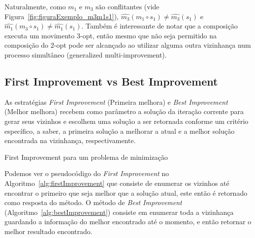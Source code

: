 Naturalmente, como $m_1$ e $m_3$ são conflitantes (vide Figura~\ref{fig:figuraExemplo_m3m1s1}), $\widehat{m_3}(m_1 \circ s_1) \neq \widehat{m_3}(s_1)$ e $\widehat{m_1}(m_3 \circ s_1) \neq \widehat{m_1}(s_1)$.
Também é interessante de notar que a composição executa um movimento 3-opt, então mesmo que não seja permitido na composição do 2-opt pode ser alcançado ao utilizar alguma outra vizinhança num processo simultâneo (generalized multi-improvement).

% 

\subsection{First Improvement vs Best Improvement} \label{subsec:firstBestImprovement}

As estratégias \textit{First Improvement} (Primeira melhora) e \textit{Best Improvement} (Melhor melhora) recebem como parâmetro a solução da iteração corrente para gerar seus vizinhos e escolhem uma solução a ser retornada conforme um critério específico, a saber, a primeira solução a melhorar a atual e a melhor solução encontrada na vizinhança, respectivamente.

\begin{algorithm}[htpb]
\caption{First Improvement para um problema de minimização}
\label{alg:firstImprovement}
\begin{algorithmic}[1]
         
             
            \EndIf
        \EndFor
         
    \EndFunction
\end{algorithmic}
\end{algorithm}

Podemos ver o pseudocódigo do \textit{First Improvement} no Algoritmo~\ref{alg:firstImprovement} que consiste de enumerar os vizinhos até encontrar o primeiro que seja melhor que a solução atual, este então é retornado como resposta do método.
O método de \textit{Best Improvement} (Algoritmo~\ref{alg:bestImprovement}) consiste em enumerar toda a vizinhança guardando a informação do melhor encontrado até o momento, e então retornar o melhor resultado encontrado.

